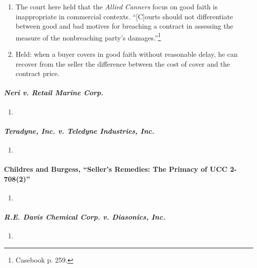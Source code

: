 \begin{enumerate}
\begin{enumerate}
    \end{enumerate}
    \item The court here held that the \emph{Allied Canners} focus on good 
    faith is inappropriate in commercial contexts. ``[C]ourts should not 
    differentiate between good and bad motives for breaching a contract in 
    assessing the measure of the nonbreaching party's 
    damages.''\footnote{Casebook p. 259.}
    \item Held: when a buyer covers in good faith without reasonable delay, 
    he can recover from the seller the difference between the cost of cover 
    and the contract price.
\end{enumerate}

\paragraph{\emph{Neri v. Retail Marine Corp.}}

\begin{enumerate}
    \item %
\end{enumerate}

\paragraph{\emph{Teradyne, Inc. v. Teledyne Industries, Inc.}}

\begin{enumerate}
    \item %
\end{enumerate}

\paragraph{Childres and Burgess, ``Seller's Remedies: The Primacy of UCC 
2-708(2)''}

\begin{enumerate}
    \item %
\end{enumerate}

\paragraph{\emph{R.E. Davis Chemical Corp. v. Diasonics, Inc.}}

\begin{enumerate}
    \item %
\end{enumerate}

